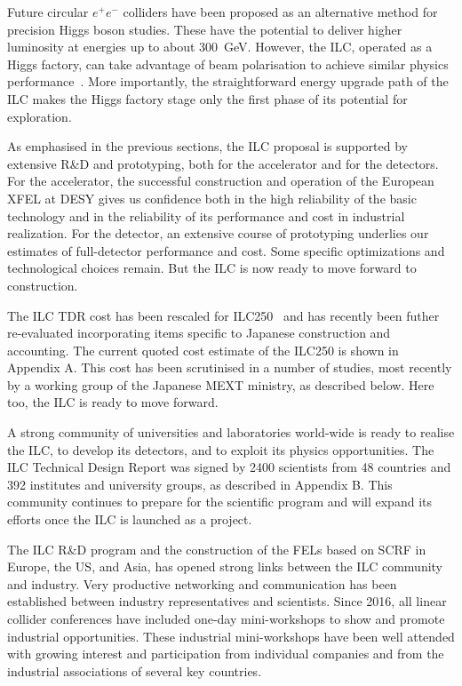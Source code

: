 \documentclass[%
 reprint,
 floatfix,
 amsmath,amssymb,
 aps,
]{revtex4-1}
\def\ee{e^+e^-}
\begin{document}
Future circular $\ee$ colliders have been proposed as an alternative 
method for precision Higgs boson studies.  These have the potential to
deliver higher luminosity at energies up to about 300~GeV.  However,
the ILC, operated as a Higgs factory, can take advantage of  beam 
polarisation to achieve similar physics
performance~\cite{Barklow:2017suo}.
More importantly, the straightforward energy
upgrade path of the ILC
makes the Higgs factory stage  only
the first phase of its potential for exploration. 

As emphasised in the previous sections, the ILC proposal
is supported by extensive R\&D and prototyping, both for the
accelerator and for the detectors.  For the accelerator,  
the successful construction and
operation 
of the European XFEL at DESY gives
us confidence both in the high reliability of the basic
technology and in the reliability of its performance and cost in 
industrial realization.   For the detector, an extensive course of
prototyping underlies our estimates of full-detector performance 
and cost.  Some specific optimizations and technological choices remain.
But the ILC is now ready to move forward to construction. 

 The ILC TDR
cost has been 
 rescaled for ILC250~\cite{Evans:2017rvt} and has recently been futher
 re-evaluated incorporating items specific to Japanese construction
 and accounting.  The current quoted cost estimate 
of the ILC250 is shown in Appendix A. 
 This cost has  been scrutinised in a number of
studies, most recently by a working group of the Japanese MEXT ministry, as described below.  Here too, the ILC is ready to move forward.

A strong community of universities and laboratories world-wide is
ready to realise the ILC, to develop its detectors, and to exploit its
physics opportunities. 
 The ILC Technical Design Report was signed by
2400 scientists from 48 countries and 392 institutes and university
groups,
 as described in Appendix B.  This community continues
 to prepare for the scientific program and
will expand its efforts once the ILC is launched as a project.
 
The ILC R\&D program and the construction of the FELs based on
SCRF in Europe, the US, and Asia, has opened strong links between the ILC
community 
and industry.  Very productive
 networking and communication has been established between industry
 representatives and scientists. Since 2016,
 all linear collider conferences have included one-day mini-workshops
 to show and promote industrial opportunities. 
These industrial mini-workshops have been well attended
 with growing  interest and participation from individual companies and from the industrial associations of several key countries.
 
\end{document}
